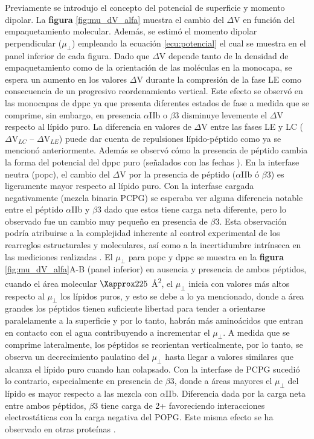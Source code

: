 Previamente se introdujo el concepto del potencial de superficie y momento dipolar. La \textbf{figura} \ref{fig:mu_dV_alfa} muestra el cambio del $\Delta$V en función del empaquetamiento molecular. Además, se estimó el momento dipolar perpendicular ($\mu_\perp$) empleando la ecuación \ref{ecu:potencial} el cual se muestra en el panel inferior de cada figura. Dado que $\Delta$V depende tanto de la densidad de empaquetamiento como de la orientación de las moléculas en la monocapa, se espera un aumento en los valores $\Delta$V durante la compresión de la fase LE como consecuencia de un progresivo  reordenamiento vertical. Este efecto se observó en las monocapas de \ac{dppc} ya que presenta diferentes estados de fase a medida que se comprime, sin embargo, en presencia $\alpha$IIb o $\beta$3 disminuye levemente el $\Delta$V respecto al lípido puro. La diferencia en valores de $\Delta$V entre las fases LE y LC ($\Delta$V$_{LC}$ -- $\Delta$V$_{LE}$) puede dar cuenta de repulsiones lípido-péptido como ya se mencionó anteriormente. Además se observó cómo la presencia de péptido cambia la forma del potencial del \ac{dppc} puro (señalados con las fechas \textcolor{black}{\faLongArrowRight}). En la interfase neutra (\ac{popc}), el cambio del $\Delta$V por la presencia de péptido ($\alpha$IIb ó  $\beta$3) es ligeramente mayor respecto al lípido puro. Con la interfase cargada negativamente (mezcla binaria PCPG) se esperaba ver alguna diferencia notable entre el péptido $\alpha$IIb y $\beta$3 dado que estos tiene carga neta diferente, pero lo observado fue un cambio muy pequeño en presencia de $\beta$3. Esta observación podría atribuirse a la complejidad inherente al control experimental de los rearreglos estructurales y moleculares, así como a la incertidumbre intrínseca en las mediciones realizadas \citep{Brockman1994}. El $\mu_\perp$ para \ac{popc} y \ac{dppc} se muestra en la \textbf{figura} \ref{fig:mu_dV_alfa}A-B (panel inferior) en ausencia y presencia de ambos péptidos, cuando el área molecular $\Xapprox 225$  Å\textsuperscript{2}, el $\mu_\perp$ inicia con  valores más altos respecto al $\mu_\perp$  los lípidos puros, y esto se debe a lo ya mencionado, donde a área grandes los péptidos tienen suficiente libertad para tender a orientarse paralelamente a la superficie y por lo tanto, habrán más aminoácidos que entran en contacto con el agua contribuyendo a incrementar el $\mu_\perp$. A medida que se comprime lateralmente, los péptidos se reorientan verticalmente, por lo tanto, se observa un decrecimiento paulatino del  $\mu_\perp$ hasta llegar a valores similares que alcanza el lípido puro cuando han colapsado. Con la interfase de PCPG sucedió lo contrario, especialmente en presencia de $\beta$3, donde a áreas mayores el $\mu_\perp$ del lípido es mayor respecto a las mezcla con $\alpha$IIb. Diferencia dada por la carga neta entre ambos péptidos, $\beta$3 tiene carga de 2+ favoreciendo interacciones electrostáticas con la carga negativa del POPG. Este misma efecto se ha observado en otras proteínas \citep{Lad2006,Alamdari2020,Schmidt2022}.


